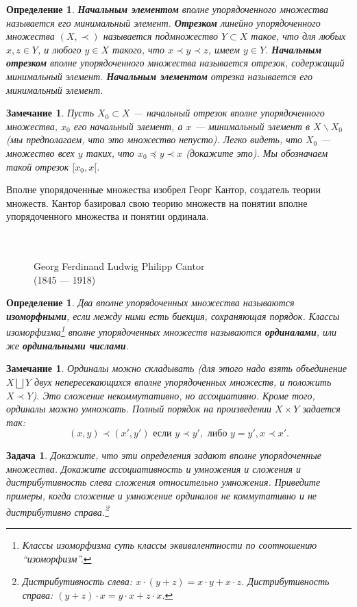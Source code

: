 \documentclass[12pt]{book}
\theoremstyle{upshape}
\newtheorem{zadacha}{Задача}[chapter]
\theoremstyle{generic}
\newtheorem{opredelenie}[teorema]{Определение}
\newtheorem{remark}[teorema]{Замечание}
\def\замечание{\begin{remark}}
\def\еза{\end{remark}}
\theoremstyle{upshapenonumber}
\newcommand{\следствие}{%
     \refstepcounter{teorema}
     {\noindent\bf Следствие \thechapter.\arabic{teorema}:\ }}
\newcommand{\пример}{%
     \refstepcounter{teorema}
     {\noindent\bf Пример \thechapter.\arabic{teorema}:\ }}
\newcommand{\лемма}{%
     \refstepcounter{teorema}
     {\noindent\bf Лемма \thechapter.\arabic{teorema}:\ }}
\newcommand{\теорема}{%
     \refstepcounter{teorema}
     {\noindent\bf Теорема \thechapter.\arabic{teorema}:\ }}
\newcommand{\утверждение}{%
     \refstepcounter{teorema}
     {\noindent\bf Утверждение \thechapter.\arabic{teorema}:\ }}
\def\бф{\bf}
\def\ем{\em}
\def\задача{\begin{zadacha}}
\def\ез{\end{zadacha}}
\def\еу{\end{ukazanie}}
\def\определение{\begin{opredelenie}}
\def\ео{\end{opredelenie}}
\def\енум{\begin{enumerate}}
\def\ее{\end{enumerate}}
\begin{document}
\определение
{\бф Начальным элементом} вполне упорядоченного
множества называется его минимальный элемент.
{\бф Отрезком} линейно упорядоченного
множества $(X, \prec)$ называется подмножество 
$Y\subset X$ такое, что для любых $x, z\in Y$,
и любого $y\in X$ такого, что $x\prec y\prec z$,
имеем $y\in Y$. {\бф Начальным отрезком}
вполне упорядоченного
множества называется отрезок, содержащий
минимальный элемент. {\бф Начальным элементом}
отрезка называется его минимальный элемент.
\ео

\замечание
Пусть $X_0\subset X$ --- начальный отрезок 
вполне упорядоченного множества, $x_0$ его
начальный элемент, а $x$ --- минимальный
элемент в $X \backslash X_0$ (мы предполагаем,
что это множество непусто). 
Легко видеть, что $X_0$ --- множество всех
$y$ таких, что $x_0\preccurlyeq y\prec x$
(докажите это).
Мы обозначаем такой отрезок $[x_0, x[$.
\еза


Вполне упорядоченные множества изобрел Георг
Кантор, создатель теории множеств. Кантор
базировал свою теорию множеств на понятии
вполне упорядоченного множества и понятии ординала.


\begin{figure}[ht]
\begin{center}\ \\
\\
{Georg Ferdinand Ludwig Philipp Cantor\\
(1845 --- 1918)}
\end{center}
\end{figure}

\определение
Два вполне упорядоченных множества называются
{\бф изоморфными}, если между ними есть
биекция, сохраняющая порядок. Классы 
изоморфизма\footnote{Классы изоморфизма суть классы эквивалентности
по соотношению ``изоморфизм''.}
вполне упорядоченных множеств называются
{\бф ординалами}, или же {\бф ординальными числами}.
\ео

\замечание
Ординалы можно складывать
(для этого надо взять объединение $X \bigsqcup Y$ двух
непересекающихся вполне упорядоченных множеств,
и положить $X \prec Y$). Это сложение некоммутативно,
но ассоциативно. Кроме того, ординалы можно умножать.  
Полный порядок на произведении $X\times Y$ задается так:
\[ (x,y) \prec (x', y') \text{ \ если\ } y\prec y',
\text{\ либо\ } y=y', x\prec x'.
\]
\еза

\задача
Докажите, что эти определения задают
вполне упорядоченные множества. Докажите
ассоциативность и умножения и сложения
и дистрибутивность слева сложения относительно
умножения. Приведите примеры, когда
сложение и умножение ординалов
не коммутативно и не дистрибутивно
справа.\footnote{Дистрибутивность слева:
$x\cdot (y+z) = x\cdot y +x\cdot z$. Дистрибутивность
справа: $(y+z)\cdot x = y\cdot x + z\cdot x$.}
\ез
\end{document}
